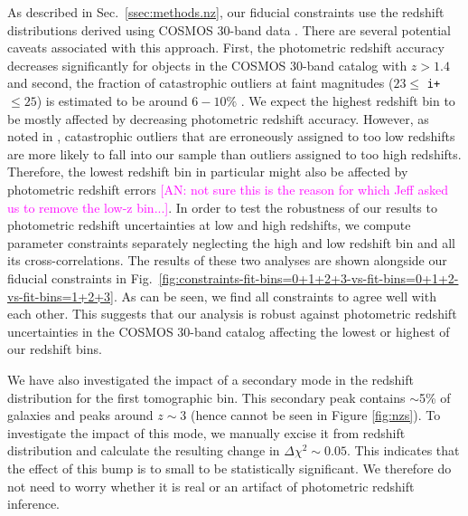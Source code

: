 \documentclass[a4paper,11pt]{article}
\newcommand{\an}[1]{{\textcolor{magenta}{[AN: #1]}}}
\begin{document}
As described in Sec.~\ref{ssec:methods.nz}, our fiducial constraints use the redshift distributions derived using COSMOS 30-band data \cite{2016ApJS..224...24L}. There are several potential caveats associated with this approach. First, the   photometric redshift accuracy decreases significantly for objects in the COSMOS 30-band catalog with $z > 1.4$ and second, the fraction of catastrophic outliers at faint magnitudes ($23 \leq$ \texttt{i+} $\leq 25$) is estimated to be around $6-10 \%$ \cite{2016ApJS..224...24L}. We expect the highest redshift bin to be mostly affected by decreasing photometric redshift accuracy. However, as noted in \cite{Joudaki:2019}, catastrophic outliers that are erroneously assigned to too low redshifts are more likely to fall into our sample than outliers assigned to too high redshifts. Therefore, the lowest redshift bin in particular might also be affected by photometric redshift errors \an{not sure this is the reason for which Jeff asked us to remove the low-z bin...}. In order to test the robustness of our results to photometric redshift uncertainties at low and high redshifts, we compute parameter constraints separately neglecting the high and low redshift bin and all its cross-correlations. The results of these two analyses are shown alongside our fiducial constraints in Fig.~\ref{fig:constraints-fit-bins=0+1+2+3-vs-fit-bins=0+1+2-vs-fit-bins=1+2+3}. As can be seen, we find all constraints to agree well with each other. This suggests that our analysis is robust against photometric redshift uncertainties in the COSMOS 30-band catalog affecting the lowest or highest of our redshift bins. 

We have also investigated the impact of a secondary mode in the redshift distribution for the first tomographic bin. This secondary peak contains $\sim$5\% of galaxies and peaks around $z\sim 3$ (hence cannot be seen in Figure \ref{fig:nzs}). To investigate the impact of this mode, we manually excise it from redshift distribution and calculate the resulting change in $\Delta \chi^2\sim 0.05$. This indicates that the effect of this bump is to small to be statistically significant. We therefore do not need to worry whether it is real or an artifact of photometric redshift inference. 
\end{document}
